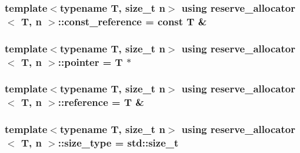 \subsubsection[{\texorpdfstring{const\+\_\+reference}{const_reference}}]{\setlength{\rightskip}{0pt plus 5cm}template$<$typename T, size\+\_\+t n$>$ using {\bf reserve\+\_\+allocator}$<$ T, n $>$\+::{\bf const\+\_\+reference} =  const T \&}\hypertarget{classreserve__allocator_a6e81b567aee2879382a0baebba111c2a}{}\label{classreserve__allocator_a6e81b567aee2879382a0baebba111c2a}
\subsubsection[{\texorpdfstring{pointer}{pointer}}]{\setlength{\rightskip}{0pt plus 5cm}template$<$typename T, size\+\_\+t n$>$ using {\bf reserve\+\_\+allocator}$<$ T, n $>$\+::{\bf pointer} =  T $\ast$}\hypertarget{classreserve__allocator_a5381e084c053670fcbcc13f1a8724a75}{}\label{classreserve__allocator_a5381e084c053670fcbcc13f1a8724a75}
\subsubsection[{\texorpdfstring{reference}{reference}}]{\setlength{\rightskip}{0pt plus 5cm}template$<$typename T, size\+\_\+t n$>$ using {\bf reserve\+\_\+allocator}$<$ T, n $>$\+::{\bf reference} =  T \&}\hypertarget{classreserve__allocator_a260b28f64b11d2c4af92d685343e074c}{}\label{classreserve__allocator_a260b28f64b11d2c4af92d685343e074c}
\subsubsection[{\texorpdfstring{size\+\_\+type}{size_type}}]{\setlength{\rightskip}{0pt plus 5cm}template$<$typename T, size\+\_\+t n$>$ using {\bf reserve\+\_\+allocator}$<$ T, n $>$\+::{\bf size\+\_\+type} =  std\+::size\+\_\+t}\hypertarget{classreserve__allocator_acaf9251a99c55feadccf2bb894db4f4f}{}\label{classreserve__allocator_acaf9251a99c55feadccf2bb894db4f4f}
